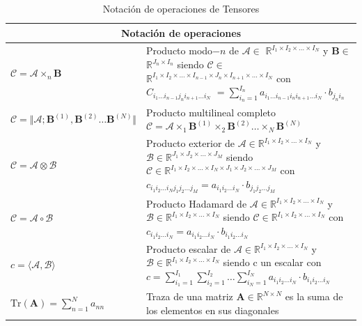 \documentclass[spanish]{article}
\theoremstyle{definition}
\theoremstyle{remark}
\numberwithin{equation}{section}
\numberwithin{equation}{section} %
\begin{document}
\begin{table}[ht]
\centering
\begin{tabular}{p{0.35\linewidth}p{0.65\linewidth}}
\hline
\multicolumn{2}{c}{\large  Notación de operaciones } \\
\hline 
 \large  $\mathcal{C}= \mathcal{A} \times_n \boldsymbol{B}$ & 
 \large  Producto modo$-n$ de $\mathcal{A} \in$ $\mathbb{R} ^{I_1 \times I_2 \times \ldots \times I_N}$ y 
 \large  $\boldsymbol{B} \in$ $\mathbb{R}^{J_n \times I_n}$ siendo $\mathcal{C} \in$ $\mathbb{R} ^{I_1 \times I_2 \times \ldots \times I_{n-1} \times J_n \times I_{n+1} \times \ldots \times I_N}$ con $C_{i_1 \ldots i_{n-1}j_ni_{n+1} \ldots i_N}$ $=\sum_{i_n=1}^{I_n} a_{i_1 \ldots i_{n-1}i_ni_{n+1} \ldots i_N} \cdot b_{j_n i_n} $\\
 
 \large  $\mathcal{C}= \Vert \mathcal{A};\boldsymbol{B}^{(1)},\boldsymbol{B}^{(2)} \ldots \boldsymbol{B}^{(N)} \Vert $ & 
 \large  Producto multilineal completo $\mathcal{C}= \mathcal{A} \times_1 \boldsymbol{B}^{(1)} \times_2 \boldsymbol{B}^{(2)}  \ldots  \times_N \boldsymbol{B}^{(N)}$ \\
 
 \large $\mathcal{C} =\mathcal{A} \otimes	 \mathcal{B}$ & 
 \large Producto exterior de $\mathcal{A} \in \mathbb{R} ^{I_1 \times I_2 \times \ldots  \times I_N}$ y $\mathcal{B} \in \mathbb{R} ^{J_1 \times J_2 \times \ldots  \times J_M}$ siendo $\mathcal{C} \in \mathbb{R} ^{I_1 \times I_2 \times \ldots  \times I_N \times J_1 \times J_2 \times \ldots  \times J_M}$ con $c_{i_1i_2 \ldots i_Nj_1j_2 \ldots j_M} = a_{i_1i_2 \ldots i_N} \cdot b_{j_1j_2 \ldots j_M} $\\
 
  \large $\mathcal{C} =\mathcal{A} \circ	 \mathcal{B}$ & 
 \large Producto Hadamard de $\mathcal{A} \in \mathbb{R} ^{I_1 \times I_2 \times \ldots  \times I_N}$ y $\mathcal{B} \in \mathbb{R} ^{I_1 \times I_2 \times \ldots  \times I_N}$ siendo $\mathcal{C} \in \mathbb{R} ^{I_1 \times I_2 \times \ldots  \times I_N}$ con $c_{i_1i_2 \ldots i_N} = a_{i_1i_2 \ldots i_N} \cdot b_{i_1i_2 \ldots i_N} $\\

 \large $c =  \langle \mathcal{A},\mathcal{B} \rangle$ & 
 \large Producto escalar de $\mathcal{A} \in \mathbb{R} ^{I_1 \times I_2 \times \ldots  \times I_N}$ y $\mathcal{B} \in \mathbb{R} ^{I_1 \times I_2 \times \ldots  \times I_N}$ siendo c un escalar con $c = \sum_{i_1=1}^{I_1} \sum_{i_2=1}^{I_2} \dots  \sum_{i_N=1}^{I_N} a_{i_1i_2 \ldots i_N} \cdot b_{i_1i_2 \ldots i_N} $\\
 
 \large $\mathrm{Tr}(\textbf{A})= \sum^N_{n=1}a_{nn}$&
 \large Traza de una matriz $\textbf{A} \in \mathbb{R} ^{N \times N}$ es la suma de los elementos en sus diagonales \\
 
\hline\hline 
\end{tabular}
\caption{Notación de operaciones de Tensores}
\label{table:NotacionOperaciones}
\end{table}
\end{document}
